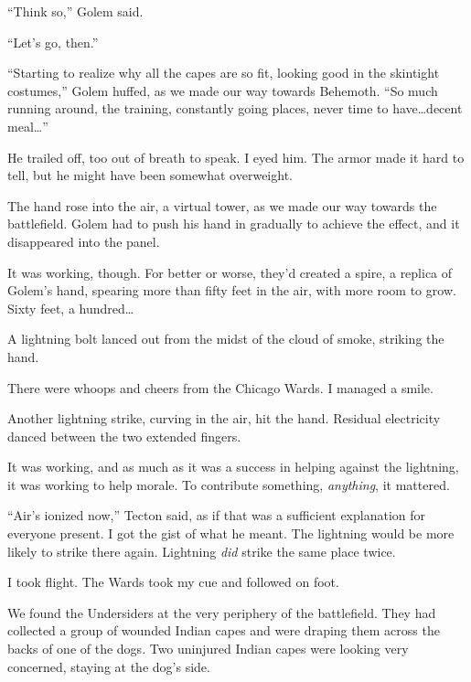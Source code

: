 ``Think so,'' Golem said.



``Let's go, then.''



``Starting to realize why all the capes are so fit, looking good in the skintight costumes,'' Golem huffed, as we made our way towards Behemoth.  ``So much running around, the training, constantly going places, never time to have\ldots decent meal\ldots''



He trailed off, too out of breath to speak.  I eyed him.  The armor made it hard to tell, but he might have been somewhat overweight.



The hand rose into the air, a virtual tower, as we made our way towards the battlefield.  Golem had to push his hand in gradually to achieve the effect, and it disappeared into the panel.



It was working, though.  For better or worse, they'd created a spire, a replica of Golem's hand, spearing more than fifty feet in the air, with more room to grow.  Sixty feet, a hundred\ldots



A lightning bolt lanced out from the midst of the cloud of smoke, striking the hand.



There were whoops and cheers from the Chicago Wards.  I managed a smile.



Another lightning strike, curving in the air, hit the hand.  Residual electricity danced between the two extended fingers.



It was working, and as much as it was a success in helping against the lightning, it was working to help morale.  To contribute something, \emph{anything}, it mattered.



``Air's ionized now,'' Tecton said, as if that was a sufficient explanation for everyone present.  I got the gist of what he meant.  The lightning would be more likely to strike there again.  Lightning \emph{did} strike the same place twice.



I took flight.  The Wards took my cue and followed on foot.



We found the Undersiders at the very periphery of the battlefield.  They had collected a group of wounded Indian capes and were draping them across the backs of one of the dogs.  Two uninjured Indian capes were looking very concerned, staying at the dog's side.



